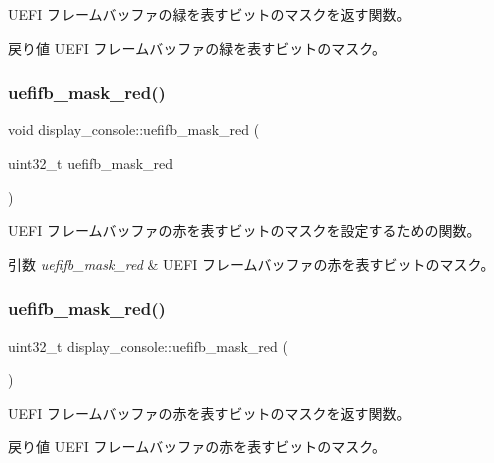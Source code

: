 U\+E\+FI フレームバッファの緑を表すビットのマスクを返す関数。 \begin{DoxyReturn}{戻り値}
U\+E\+FI フレームバッファの緑を表すビットのマスク。 
\end{DoxyReturn}
\hypertarget{classdisplay__console_ae9aa4a1e7451bf5714123631010bf32c}{}\label{classdisplay__console_ae9aa4a1e7451bf5714123631010bf32c} 
\subsubsection{\texorpdfstring{uefifb\+\_\+mask\+\_\+red()}{uefifb\_mask\_red()}\hspace{0.1cm}{\footnotesize\ttfamily [1/2]}}
{\footnotesize\ttfamily void display\+\_\+console\+::uefifb\+\_\+mask\+\_\+red (\begin{DoxyParamCaption}\item[{uint32\+\_\+t}]{uefifb\+\_\+mask\+\_\+red }\end{DoxyParamCaption})}

U\+E\+FI フレームバッファの赤を表すビットのマスクを設定するための関数。 
\begin{DoxyParams}{引数}
{\em uefifb\+\_\+mask\+\_\+red} & U\+E\+FI フレームバッファの赤を表すビットのマスク。 \\
\hline
\end{DoxyParams}
\hypertarget{classdisplay__console_af31bb334255868e64ecffb392057216f}{}\label{classdisplay__console_af31bb334255868e64ecffb392057216f} 
\subsubsection{\texorpdfstring{uefifb\+\_\+mask\+\_\+red()}{uefifb\_mask\_red()}\hspace{0.1cm}{\footnotesize\ttfamily [2/2]}}
{\footnotesize\ttfamily uint32\+\_\+t display\+\_\+console\+::uefifb\+\_\+mask\+\_\+red (\begin{DoxyParamCaption}{ }\end{DoxyParamCaption})}

U\+E\+FI フレームバッファの赤を表すビットのマスクを返す関数。 \begin{DoxyReturn}{戻り値}
U\+E\+FI フレームバッファの赤を表すビットのマスク。 
\end{DoxyReturn}
\hypertarget{classdisplay__console_adc561d3a6e6a32d27407dd94b3e9173b}{}\label{classdisplay__console_adc561d3a6e6a32d27407dd94b3e9173b} 
